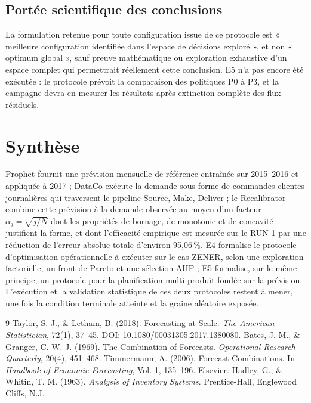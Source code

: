 \documentclass[11pt,a4paper]{article}
\begin{document}
\subsection{Portée scientifique des conclusions}

La formulation retenue pour toute configuration issue de ce protocole est « meilleure configuration identifiée dans l'espace de décisions exploré », et non « optimum global », sauf preuve mathématique ou exploration exhaustive d'un espace complet qui permettrait réellement cette conclusion. E5 n'a pas encore été exécutée : le protocole prévoit la comparaison des politiques P0 à P3, et la campagne devra en mesurer les résultats après extinction complète des flux résiduels.

\section{Synthèse}

Prophet fournit une prévision mensuelle de référence entraînée sur 2015--2016 et appliquée à 2017 ; DataCo exécute la demande sous forme de commandes clientes journalières qui traversent le pipeline Source, Make, Deliver ; le Recalibrator combine cette prévision à la demande observée au moyen d'un facteur $\alpha_j=\sqrt{j/N}$ dont les propriétés de bornage, de monotonie et de concavité justifient la forme, et dont l'efficacité empirique est mesurée sur le RUN 1 par une réduction de l'erreur absolue totale d'environ 95,06\,\%. E4 formalise le protocole d'optimisation opérationnelle à exécuter sur le cas ZENER, selon une exploration factorielle, un front de Pareto et une sélection AHP ; E5 formalise, sur le même principe, un protocole pour la planification multi-produit fondée sur la prévision. L'exécution et la validation statistique de ces deux protocoles restent à mener, une fois la condition terminale atteinte et la graine aléatoire exposée.

\begin{thebibliography}{9}
\small
{} Taylor, S. J., \& Letham, B. (2018). Forecasting at Scale. \emph{The American Statistician}, 72(1), 37--45. DOI: 10.1080/00031305.2017.1380080.
 Bates, J. M., \& Granger, C. W. J. (1969). The Combination of Forecasts. \emph{Operational Research Quarterly}, 20(4), 451--468.
 Timmermann, A. (2006). Forecast Combinations. In \emph{Handbook of Economic Forecasting}, Vol. 1, 135--196. Elsevier.
 Hadley, G., \& Whitin, T. M. (1963). \emph{Analysis of Inventory Systems}. Prentice-Hall, Englewood Cliffs, N.J.
\end{thebibliography}
\end{document}
